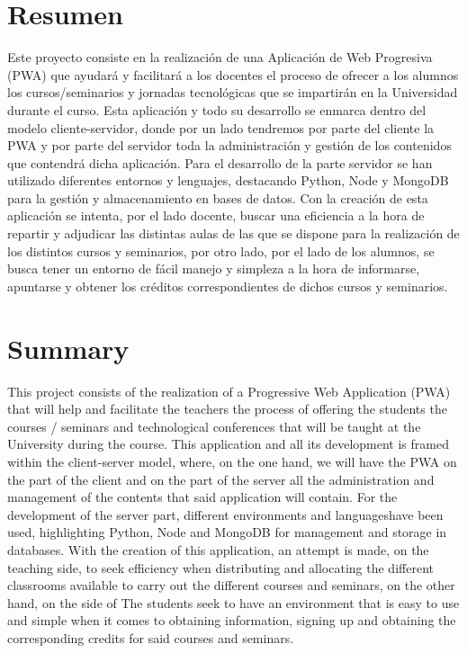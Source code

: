 \documentclass[a4paper, 12pt]{book}
\begin{document}

\chapter*{Resumen}

	Este proyecto consiste en la realización de una Aplicación de Web Progresiva (PWA) que ayudará y facilitará a los docentes el proceso de ofrecer a los alumnos los cursos/seminarios y jornadas tecnológicas que se impartirán en la Universidad durante el curso.
	Esta aplicación y todo su desarrollo se enmarca dentro del modelo cliente-servidor, donde por un lado tendremos por parte del cliente la PWA y por parte del servidor toda la administración y gestión de los contenidos que contendrá dicha aplicación.
	Para el desarrollo de la parte servidor se han utilizado diferentes entornos y lenguajes, destacando Python, Node y MongoDB para la gestión y almacenamiento en bases de datos.
	Con la creación de esta aplicación se intenta, por el lado docente, buscar una eficiencia a la hora de repartir y adjudicar las distintas aulas de las que se dispone para la realización de los distintos cursos y seminarios, por otro lado, por el lado de los alumnos, se busca tener un entorno de fácil manejo y simpleza a la hora de informarse, apuntarse y obtener los créditos correspondientes de dichos cursos y seminarios.


\chapter*{Summary}

This project consists of the realization of a Progressive Web Application (PWA) that will help and facilitate the teachers the process of offering the students the courses / seminars and technological conferences that will be taught at the University during the course.
This application and all its development is framed within the client-server model, where, on the one hand, we will have the PWA on the part of the client and on the part of the server all the administration and management of the contents that said application will contain.
For the development of the server part, different environments and languages ​​have been used, highlighting Python, Node and MongoDB for management and storage in databases.
With the creation of this application, an attempt is made, on the teaching side, to seek efficiency when distributing and allocating the different classrooms available to carry out the different courses and seminars, on the other hand, on the side of The students seek to have an environment that is easy to use and simple when it comes to obtaining information, signing up and obtaining the corresponding credits for said courses and seminars.
\end{document}
